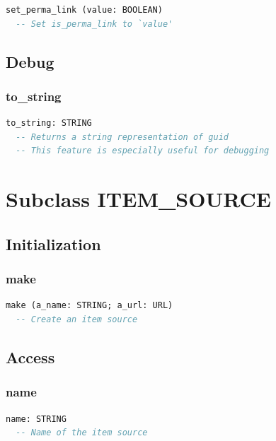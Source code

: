 \begin{lstlisting}[language=Eiffel]
set_perma_link (value: BOOLEAN)
  -- Set is_perma_link to `value'
\end{lstlisting}

\subsection{Debug}
\label{sec:item-guid-debug}

\subsubsection{to\_string}

\begin{lstlisting}[language=Eiffel]
to_string: STRING
  -- Returns a string representation of guid
  -- This feature is especially useful for debugging
\end{lstlisting}

\section{Subclass ITEM\_SOURCE}
\label{sec:item-source}

\subsection{Initialization}
\label{sec:item-source-initialization}

\subsubsection{make}

\begin{lstlisting}[language=Eiffel]
make (a_name: STRING; a_url: URL)
  -- Create an item source
\end{lstlisting}

\subsection{Access}
\label{sec:item-source-access}

\subsubsection{name}

\begin{lstlisting}[language=Eiffel]
name: STRING
  -- Name of the item source
\end{lstlisting}

